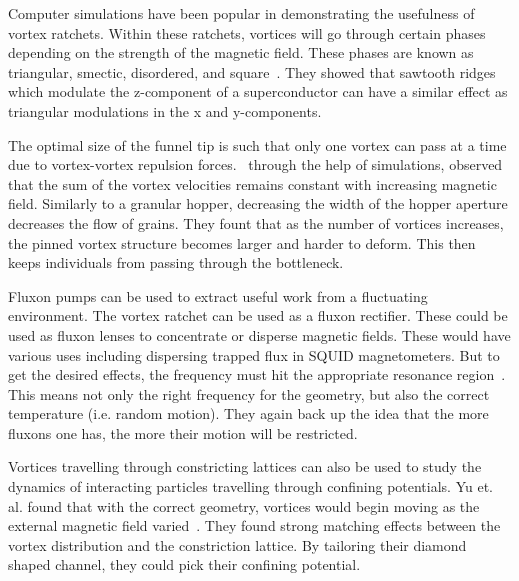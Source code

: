 Computer simulations have been popular in demonstrating the usefulness of vortex ratchets. Within these ratchets, vortices will go through certain phases depending on the strength of the magnetic field. These phases are known as triangular, smectic, disordered, and square~\cite{Lu06}. They showed that sawtooth ridges which modulate the z-component of a superconductor can have a similar effect as triangular modulations in the x and y-components. 

The optimal size of the funnel tip is such that only one vortex can pass at a time due to vortex-vortex repulsion forces.~\cite{Reichhardt10} through the help of simulations, observed that the sum of the vortex velocities remains constant with increasing magnetic field. Similarly to a granular hopper, decreasing the width of the hopper aperture decreases the flow of grains. They fount that as the number of vortices increases, the pinned vortex structure becomes larger and harder to deform. This then keeps individuals from passing through the bottleneck. 

Fluxon pumps can be used to extract useful work from a fluctuating environment. The vortex ratchet can be used as a fluxon rectifier. These could be used as fluxon lenses to concentrate or disperse magnetic fields. These would have various uses including dispersing trapped flux in SQUID magnetometers. But to get the desired effects, the frequency must hit the appropriate resonance region~\cite{Wambaugh99}. This means not only the right frequency for the geometry, but also the correct temperature (i.e. random motion). They again back up the idea that the more fluxons one has, the more their motion will be restricted. 

Vortices travelling through constricting lattices can also be used to study the dynamics of interacting particles travelling through confining potentials. Yu et. al. found that with the correct geometry, vortices would begin moving as the external magnetic field varied~\cite{Yu10}. They found strong matching effects between the vortex distribution and the constriction lattice. By tailoring their diamond shaped channel, they could pick their confining potential.
 


